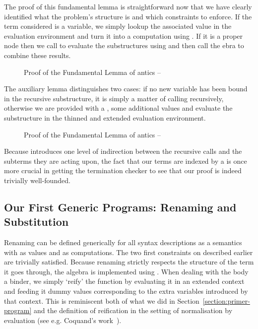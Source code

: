 The proof  of this fundamental lemma is straightforward now
that we have clearly identified what the problem's structure is and
which constraints to enforce. If the term considered is a variable,
we simply lookup the associated value in the evaluation environment
and turn it into a computation using . If it is a proper
node then we call  to evaluate the substructures using
 and then call the ebra to combine these results.

\begin{figure}[h]
\caption{Proof of the Fundamental Lemma of antics -- }
\end{figure}

The auxiliary lemma  distinguishes two cases: if no new
variable has been bound in the recursive substructure, it is simply
a matter of calling  recursively, otherwise we are provided
with a , some additional values and evaluate the
substructure in the thinned and extended evaluation environment.

\begin{figure}[h]
\caption{Proof of the Fundamental Lemma of antics -- }
\end{figure}

Because  introduces one level of indirection between the
recursive calls and the subterms they are acting upon, the fact
that our terms are indexed by a  is once more crucial in
getting the termination checker to see that our proof is indeed
trivially well-founded.

\subsection{Our First Generic Programs: Renaming and Substitution}

Renaming can be defined generically for all syntax descriptions as a
semantics with  as values and  as computations. The
two first constraints on  described earlier are trivially
satisfied. Because renaming strictly respects the structure of the
term it goes through, the algebra is implemented using .
When dealing with the body a binder, we simply `reify' the
 function by evaluating it in an extended context and
feeding it dummy values corresponding to the extra variables
introduced by that context. This is reminiscent both of what we
did in Section~\ref{section:primer-program} and the definition
of reification in the setting of normalisation by evaluation
(see e.g. Coquand's work~\citeyear{coquand2002formalised}).


